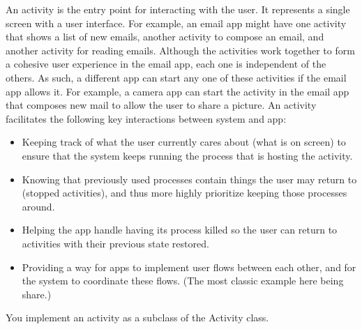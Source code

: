 \documentclass[14pt]{report}
\begin{document}
					An activity is the entry point for interacting with the user. It represents a single screen with a user interface. For example, an email app might have one activity that shows a list of new emails, another activity to compose an email, and another activity for reading emails. Although the activities work together to form a cohesive user experience in the email app, each one is independent of the others. As such, a different app can start any one of these activities if the email app allows it. For example, a camera app can start the activity in the email app that composes new mail to allow the user to share a picture. An activity facilitates the following key interactions between system and app:
					\begin{itemize}
						\item Keeping track of what the user currently cares about (what is on screen) to ensure that the system keeps running the process that is hosting the activity.
						\item Knowing that previously used processes contain things the user may return to (stopped activities), and thus more highly prioritize keeping those processes around.
						\item Helping the app handle having its process killed so the user can return to activities with their previous state restored.
						\item Providing a way for apps to implement user flows between each other, and for the system to coordinate these flows. (The most classic example here being share.)
					\end{itemize}

					You implement an activity as a subclass of the Activity class.
\end{document}
